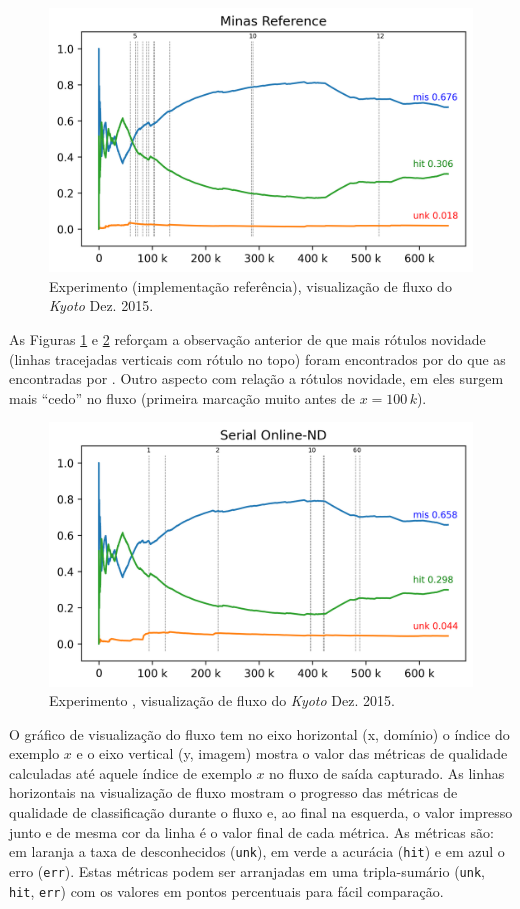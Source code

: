 \begin{figure}[htb]
  \centering
  \includegraphics[width=0.75\linewidth]{experiments/revised-java-log.png}
  \caption{Experimento  (implementação referência), visualização de fluxo do \dataset \emph{Kyoto} Dez. 2015.}
  \label{fig:validation-java}
\end{figure}

As Figuras \ref{fig:validation-java} e \ref{fig:validation-serial} reforçam a
observação anterior de que mais rótulos novidade (linhas tracejadas verticais
com rótulo no topo) foram encontrados por  do que as encontradas por
\serial.
Outro aspecto com relação a rótulos novidade, em  eles surgem mais
``cedo'' no fluxo (primeira marcação muito antes de $x = 100\,k$).

\begin{figure}[htb]
  \centering
  \includegraphics[width=0.75\linewidth]{experiments/online-nd-log.png}
  \caption{Experimento \serial, visualização de fluxo do \dataset \emph{Kyoto} Dez. 2015.}
  \label{fig:validation-serial}
\end{figure}

O gráfico de visualização do fluxo tem no eixo horizontal (x, domínio) o índice
do exemplo $x$ e o eixo vertical (y, imagem) mostra o valor das métricas de qualidade
calculadas até aquele índice de exemplo $x$ no fluxo de saída capturado.
As linhas horizontais na visualização de fluxo mostram o progresso das métricas
de qualidade de classificação durante o fluxo e, ao final na esquerda, o valor
impresso junto e de mesma cor da linha é o valor final de cada métrica.
As métricas são: 
em laranja a taxa de desconhecidos (\texttt{unk}),
em verde a acurácia (\texttt{hit}) e
em azul o erro (\texttt{err}).
Estas métricas podem ser arranjadas em uma tripla-sumário
(\texttt{unk}, \texttt{hit}, \texttt{err})
com os valores em pontos percentuais para fácil comparação.

